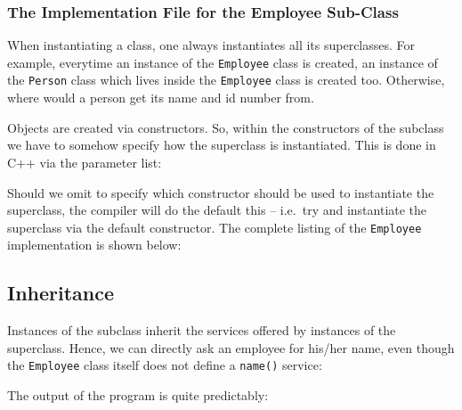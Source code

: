 
\subsubsection{The Implementation File for the Employee Sub-Class}

When instantiating a class, one always instantiates all its superclasses.
For example, everytime an instance of the \verb+Employee+ class is created, 
an instance of the \verb+Person+ class which lives inside the \verb+Employee+
class is created too. Otherwise, where would a person get its name and id 
number from. 

Objects are created via constructors. So, within the constructors of the
subclass we have to somehow specify how the superclass is instantiated.
This is done in C++ via the parameter list:


Should we omit to specify which constructor should be used to instantiate
the superclass, the compiler will do the default this -- i.e.\ try and 
instantiate the superclass via the default constructor. The complete
listing of the \verb+Employee+ implementation is shown below:

\noindent {\small }


\subsection{Inheritance}

Instances of the subclass inherit the services offered by instances of the
superclass. Hence, we can directly ask an employee for his/her name, even
though the \verb+Employee+ class itself does not define a \verb+name()+
service:

\noindent {\small }

The output of the program is quite predictably:


